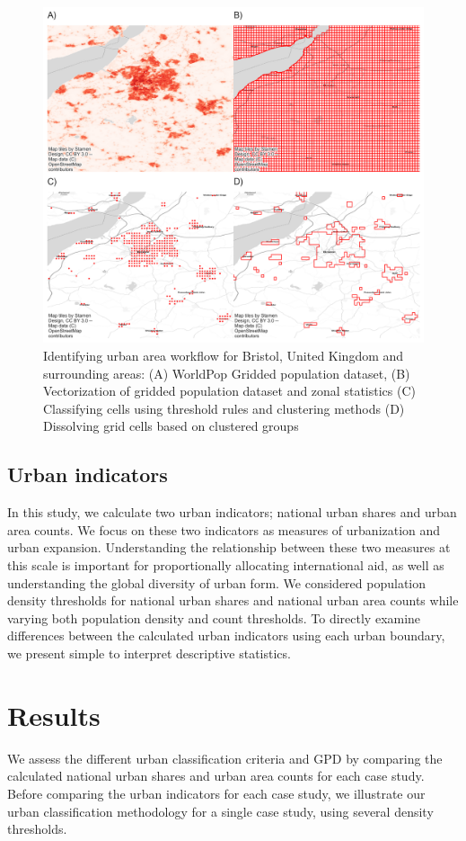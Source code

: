\documentclass[review]{elsarticle}
\begin{document}
	
	\begin{figure}[H]
		\includegraphics[width=\textwidth]{workflow_bristol}
		\caption{Identifying urban area workflow for Bristol, United Kingdom and surrounding areas: (A) WorldPop Gridded population dataset, (B) Vectorization of gridded population dataset and zonal statistics (C) Classifying cells using threshold rules and clustering methods (D) Dissolving grid cells based on clustered groups}
		\label{fig:explaining_method}
	\end{figure}
	
	
	\subsection{Urban indicators}
	In this study, we calculate two urban indicators; national urban shares and urban area counts. 
	We focus on these two indicators as measures of urbanization and urban expansion.
	Understanding the relationship between these two measures at this scale is important for proportionally allocating international aid, as well as understanding the global diversity of urban form.
	We considered population density thresholds for national urban shares and national urban area counts while varying both population density and count thresholds.
	To directly examine differences between the calculated urban indicators using each urban boundary, we present simple to interpret descriptive statistics.
	
	
	\section{Results}
	We assess the different urban classification criteria and GPD by comparing the calculated national urban shares and urban area counts for each case study.
	Before comparing the urban indicators for each case study, we illustrate our urban classification methodology for a single case study, using several density thresholds.
	
\end{document}
